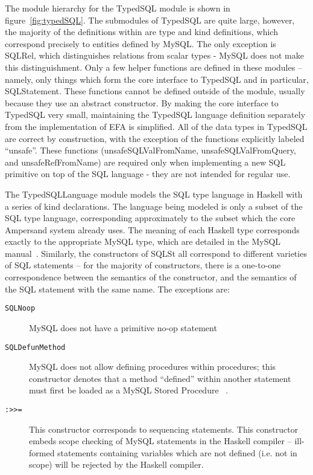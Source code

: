 \documentclass[12pt, svgnames]{article}
\begin{document}
The module hierarchy for the TypedSQL module is shown in
figure~\ref{fig:typedSQL}. The submodules of TypedSQL are quite large, however,
the majority of the definitions within are type and kind definitions, which correspond 
precisely to entities defined by MySQL. The only exception is SQLRel, which distinguishes
relations from scalar types - MySQL does not make this distinguishment. Only a few
helper functions are defined in these modules -- namely, only things which form
the core interface to TypedSQL and in particular, SQLStatement. These functions
cannot be defined outside of the module, usually because they use an abstract
constructor. By making the core interface to TypedSQL very small, maintaining 
the TypedSQL language definition separately from the implementation of 
EFA is simplified. All of the data types in TypedSQL are correct by 
construction, with the exception of the functions explicitly labeled ``unsafe''.
These functions (unsafeSQLValFromName, unsafeSQLValFromQuery, and unsafeRefFromName)
are required only when implementing a new SQL primitive on top of the SQL
language - they are not intended for regular use. 

The TypedSQLLanguage module models the SQL type language in Haskell with a
series of kind declarations. The language being modeled is only a subset of the
SQL type language, corresponding approximately to the subset which the core
Ampersand system already uses. The meaning of each Haskell type corresponds
exactly to the appropriate MySQL type, which are detailed in the MySQL
manual~\cite{mySQLman}. Similarly, the constructors of SQLSt all correspond
to different varieties of SQL statements -- for the majority of constructors,
there is a one-to-one correspondence between the semantics of the constructor,
and the semantics of the SQL statement with the same name. The exceptions 
are: 

\begin{description}
\item[\texttt{SQLNoop}] MySQL does not have a primitive no-op statement
\item[\texttt{SQLDefunMethod}]  MySQL does not allow defining procedures within procedures; 
  this constructor denotes that a method ``defined'' within another statement must 
  first be loaded as a MySQL Stored Procedure ~\cite{mySQLman}.
\item[\texttt{:>>=}] This constructor corresponds to sequencing statements. This constructor
  embeds scope checking of MySQL statements in the Haskell compiler -- ill-formed statements
  containing variables which are not defined (i.e. not in scope) will be rejected by the Haskell
  compiler. 
\end{description}
\end{document}
